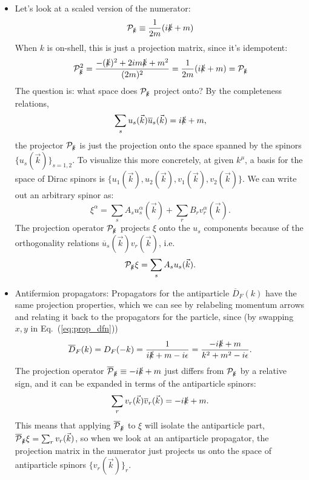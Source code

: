 \documentclass[12pt, oneside]{article}   	%
\theoremstyle{definition}
\begin{document}
\begin{itemize}
	\item Let's look at a scaled version of the numerator:
	\begin{equation}
		\mathcal P_{\slashed k} \equiv \frac{1}{2m} (i\slashed k + m)
	\end{equation}
	When $k$ is on-shell, this is just a projection matrix, since it's idempotent:
	\begin{equation}
		\mathcal P_{\slashed k}^2 = \frac{-(\slashed k)^2 + 2im \slashed k + m^2}{(2m)^2} = \frac{1}{2m} (i\slashed k + m) = \mathcal P_{\slashed k}
	\end{equation}
	The question is: what space does $\mathcal P_{\slashed k}$ project onto? By the completeness relations,
	\begin{equation}
		\sum_s u_s(\vec k)\overline{u}_s(\vec k) = i\slashed k +  m,
	\end{equation}
	the projector $\mathcal P_{\slashed k}$ is just the projection onto the space spanned by the spinors $\{u_s(\vec k)\}_{s = 1, 2}$. To visualize this more concretely, at given $k^\mu$, a basis for the space of Dirac spinors is $\{u_1(\vec k), u_2(\vec k), v_1(\vec k), v_2(\vec k)\}$. We can write out an arbitrary spinor as:
	\begin{equation}
		\xi^\alpha = \sum_s A_s u_s^\alpha(\vec k) + \sum_r B_r v_r^\alpha(\vec k).
	\end{equation}
	The projection operator $\mathcal P_{\slashed k}$ projects $\xi$ onto the $u_s$ components because of the orthogonality relations $\overline{u}_s(\vec k) v_r(\vec k)$, i.e. 
	\begin{equation}
		\mathcal P_{\slashed k} \xi = \sum_s A_s u_s(\vec k).
	\end{equation}
	
	\item Antifermion propagators: Propagators for the antiparticle $\overline{D}_F(k)$ have the same projection properties, which we can see by relabeling momentum arrows and relating it back to the propagators for the particle, since (by swapping $x, y$ in Eq.~(\ref{eq:prop_dfn}))
	\begin{equation}
		\overline{D}_F(k) = D_F(-k) = \frac{1}{i\slashed{k} + m - i\epsilon} = \frac{-i\slashed{k} + m}{k^2 + m^2 - i\epsilon}. 
	\end{equation}
	The projection operator $\overline{\mathcal P}_{\slashed k}\equiv -i\slashed k + m$ just differs from $\mathcal P_{\slashed k}$ by a relative sign, and it can be expanded in terms of the antiparticle spinors:
	\begin{equation}
		\sum_r v_r(\vec k)\overline{v}_r(\vec k) = -i\slashed k + m.
	\end{equation}
	This means that applying $\overline{\mathcal P}_{\slashed k}$ to $\xi$ will isolate the antiparticle part, $\overline{\mathcal P}_{\slashed k} \xi = \sum_r v_r(\vec k)$, so when we look at an antiparticle propagator, the projection matrix in the numerator just projects us onto the space of antiparticle spinors $\{v_r(\vec k)\}_r$. 
	

\end{itemize}
\end{document}
